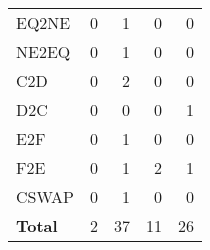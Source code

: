 \begin{tabular}{lrrrr}
            EQ2NE & 0 & 1 & 0 & 0 \\
            NE2EQ & 0 & 1 & 0 & 0 \\
    \midrule
            C2D & 0 & 2 & 0 & 0 \\
            D2C & 0 & 0 & 0 & 1 \\
    \midrule
            E2F & 0 & 1 & 0 & 0 \\
            F2E & 0 & 1 & 2 & 1 \\
    \midrule
            CSWAP & 0 & 1 & 0 & 0 \\
    \midrule
    \textbf{Total} & 2 & 37 & 11 & 26 \\
    \bottomrule
\end{tabular}
